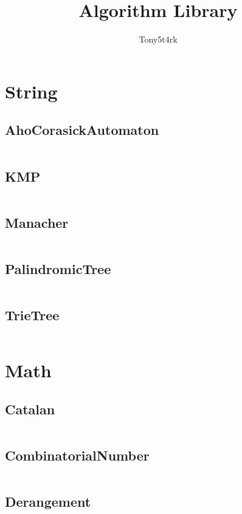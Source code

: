 \documentclass[a4paper,11pt]{article}
\author{Tony5t4rk}
\title{Algorithm Library}
\begin{document}
 
\maketitle
\newpage
\tableofcontents
\newpage

\section{String}
\subsection{AhoCorasickAutomaton}
\inputminted[breaklines]{c++}{01++String/+AhoCorasickAutomaton.cpp}
\subsection{KMP}
\inputminted[breaklines]{c++}{01++String/+KMP.cpp}
\subsection{Manacher}
\inputminted[breaklines]{c++}{01++String/+Manacher.cpp}
\subsection{PalindromicTree}
\inputminted[breaklines]{c++}{01++String/+PalindromicTree.cpp}
\subsection{TrieTree}
\inputminted[breaklines]{c++}{01++String/+TrieTree.cpp}

\newpage
\section{Math}
\subsection{Catalan}
\inputminted[breaklines]{c++}{02++Math/+Catalan.cpp}
\subsection{CombinatorialNumber}
\inputminted[breaklines]{c++}{02++Math/+CombinatorialNumber.cpp}
\subsection{Derangement}
\inputminted[breaklines]{c++}{02++Math/+Derangement.cpp}
\end{document}
